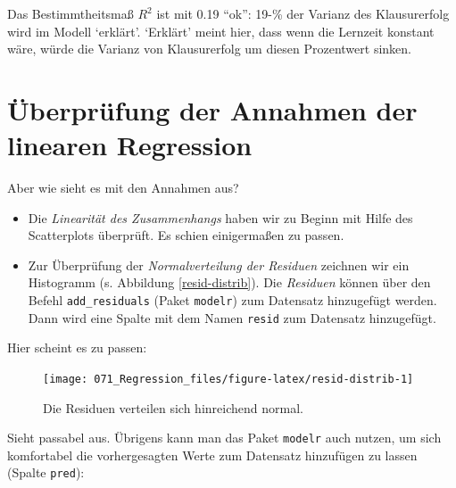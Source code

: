 \documentclass[12pt,ngerman,]{book}
\makeatletter
\newenvironment{Shaded}{\begin{snugshade}}{\end{snugshade}}
\newcommand{\KeywordTok}[1]{\textcolor[rgb]{0.13,0.29,0.53}{\textbf{{#1}}}}
\newcommand{\DataTypeTok}[1]{\textcolor[rgb]{0.13,0.29,0.53}{{#1}}}
\newcommand{\StringTok}[1]{\textcolor[rgb]{0.31,0.60,0.02}{{#1}}}
\newcommand{\NormalTok}[1]{{#1}}
\newenvironment{kframe}{%
\medskip{}
\setlength{\fboxsep}{.8em}
 \def\at@end@of@kframe{}%
 \ifinner\ifhmode%
  \def\at@end@of@kframe{\end{minipage}}%
  \begin{minipage}{\columnwidth}%
 \fi\fi%
 \def\FrameCommand##1{\hskip\@totalleftmargin \hskip-\fboxsep
 \colorbox{shadecolor}{##1}\hskip-\fboxsep
     \hskip-\linewidth \hskip-\@totalleftmargin \hskip\columnwidth}%
 \MakeFramed {\advance\hsize-\width
   \@totalleftmargin\z@ \linewidth\hsize
   \@setminipage}}%
 {\par\unskip\endMakeFramed%
 \at@end@of@kframe}
\renewenvironment{Shaded}{\begin{kframe}}{\end{kframe}}
\theoremstyle{definition}
\theoremstyle{definition}
\theoremstyle{remark}
\makeatother
\begin{document}
Das Bestimmtheitsmaß \(R^2\) ist mit 0.19 ``ok'': 19-\% der Varianz des
Klausurerfolg wird im Modell `erklärt'. `Erklärt' meint hier, dass wenn
die Lernzeit konstant wäre, würde die Varianz von Klausurerfolg um
diesen Prozentwert sinken.

\section{Überprüfung der Annahmen der linearen
Regression}\label{uberprufung-der-annahmen-der-linearen-regression}

Aber wie sieht es mit den Annahmen aus?

\begin{itemize}
\item
  Die \emph{Linearität des Zusammenhangs} haben wir zu Beginn mit Hilfe
  des Scatterplots überprüft. Es schien einigermaßen zu passen.
\item
  Zur Überprüfung der \emph{Normalverteilung der Residuen} zeichnen wir
  ein Histogramm (s. Abbildung \ref{resid-distrib}). Die
  \emph{Residuen} können über den Befehl
  \texttt{add\_residuals} (Paket \texttt{modelr}) zum Datensatz
  hinzugefügt werden. Dann wird eine Spalte mit dem Namen \texttt{resid}
  zum Datensatz hinzugefügt.
\end{itemize}

Hier scheint es zu passen:

\begin{Shaded}
\end{Shaded}

\begin{figure}

{\centering \texttt{[image: 071\_Regression\_files/figure-latex/resid-distrib-1]} 

}

\caption{Die Residuen verteilen sich hinreichend normal.}\label{fig:resid-distrib}
\end{figure}

Sieht passabel aus. Übrigens kann man das Paket \texttt{modelr} auch
nutzen, um sich komfortabel die vorhergesagten Werte zum Datensatz
hinzufügen zu lassen (Spalte \texttt{pred}):
\end{document}
